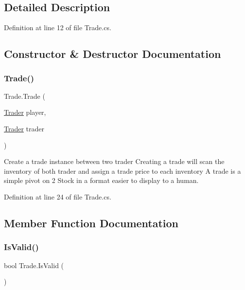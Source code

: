 \subsection{Detailed Description}


Definition at line 12 of file Trade.\+cs.



\subsection{Constructor \& Destructor Documentation}
\mbox{\label{class_trade_a6c33a0460eeb227454ca5796694ca377}} 
\subsubsection{\texorpdfstring{Trade()}{Trade()}}
{\footnotesize\ttfamily Trade.\+Trade (\begin{DoxyParamCaption}\item[{\hyperlink{class_trader}{Trader}}]{player,  }\item[{\hyperlink{class_trader}{Trader}}]{trader }\end{DoxyParamCaption})}



Create a trade instance between two trader Creating a trade will scan the inventory of both trader and assign a trade price to each inventory A trade is a simple pivot on 2 Stock in a format easier to display to a human. 



Definition at line 24 of file Trade.\+cs.



\subsection{Member Function Documentation}
\mbox{\label{class_trade_aecd1f04d634f477fa7325a618d33a066}} 
\subsubsection{\texorpdfstring{Is\+Valid()}{IsValid()}}
{\footnotesize\ttfamily bool Trade.\+Is\+Valid (\begin{DoxyParamCaption}{ }\end{DoxyParamCaption})}



